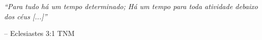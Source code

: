 \vspace*{15cm}

\epigraph{\it ``Para tudo há um tempo determinado; Há um tempo para toda atividade debaixo dos céus [...]''}{-- Eclesiastes 3:1 TNM}

\cleardoublepage